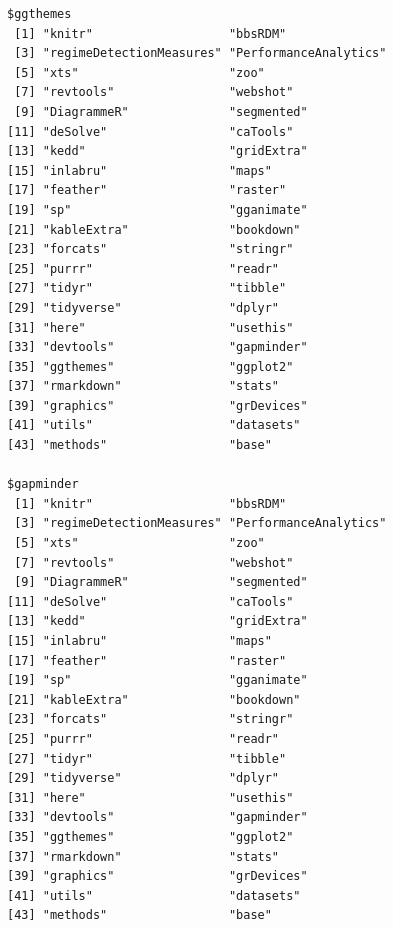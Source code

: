 \documentclass[12pt,twoside,openany]{reedthesis}
\begin{document}
\begin{verbatim}
$ggthemes
 [1] "knitr"                   "bbsRDM"                 
 [3] "regimeDetectionMeasures" "PerformanceAnalytics"   
 [5] "xts"                     "zoo"                    
 [7] "revtools"                "webshot"                
 [9] "DiagrammeR"              "segmented"              
[11] "deSolve"                 "caTools"                
[13] "kedd"                    "gridExtra"              
[15] "inlabru"                 "maps"                   
[17] "feather"                 "raster"                 
[19] "sp"                      "gganimate"              
[21] "kableExtra"              "bookdown"               
[23] "forcats"                 "stringr"                
[25] "purrr"                   "readr"                  
[27] "tidyr"                   "tibble"                 
[29] "tidyverse"               "dplyr"                  
[31] "here"                    "usethis"                
[33] "devtools"                "gapminder"              
[35] "ggthemes"                "ggplot2"                
[37] "rmarkdown"               "stats"                  
[39] "graphics"                "grDevices"              
[41] "utils"                   "datasets"               
[43] "methods"                 "base"                   

$gapminder
 [1] "knitr"                   "bbsRDM"                 
 [3] "regimeDetectionMeasures" "PerformanceAnalytics"   
 [5] "xts"                     "zoo"                    
 [7] "revtools"                "webshot"                
 [9] "DiagrammeR"              "segmented"              
[11] "deSolve"                 "caTools"                
[13] "kedd"                    "gridExtra"              
[15] "inlabru"                 "maps"                   
[17] "feather"                 "raster"                 
[19] "sp"                      "gganimate"              
[21] "kableExtra"              "bookdown"               
[23] "forcats"                 "stringr"                
[25] "purrr"                   "readr"                  
[27] "tidyr"                   "tibble"                 
[29] "tidyverse"               "dplyr"                  
[31] "here"                    "usethis"                
[33] "devtools"                "gapminder"              
[35] "ggthemes"                "ggplot2"                
[37] "rmarkdown"               "stats"                  
[39] "graphics"                "grDevices"              
[41] "utils"                   "datasets"               
[43] "methods"                 "base"                   


\end{verbatim}
\end{document}
